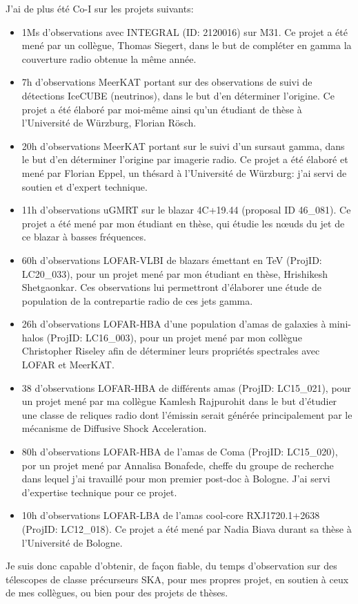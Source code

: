 \pg
J'ai de plus \'et\'e Co-I sur les projets suivants:
\begin{itemize}
	\item 1Ms d'observations avec INTEGRAL (ID: 2120016) sur M31. Ce projet a \'et\'e men\'e par un coll\`egue, Thomas Siegert, dans le but de compl\'eter en gamma la couverture radio obtenue la m\^eme ann\'ee.
	\item 7h d'observations MeerKAT portant sur des observations de suivi de d\'etections IceCUBE (neutrinos), dans le but d'en d\'eterminer l'origine. Ce projet a \'et\'e \'elabor\'e par moi-m\^eme ainsi qu'un \'etudiant de th\`ese \`a l'Universit\'e de W\"urzburg, Florian R\"osch.
	\item 20h d'observations MeerKAT portant sur le suivi d'un sursaut gamma, dans le but d'en d\'eterminer l'origine par imagerie radio. Ce projet a \'et\'e \'elabor\'e et men\'e par Florian Eppel, un th\'esard \`a l'Universit\'e de W\"urzburg: j'ai servi de soutien et d'expert technique.
	\item 11h d'observations uGMRT sur le blazar 4C+19.44 (proposal ID 46\_081). Ce projet a \'et\'e men\'e par mon \'etudiant en th\`ese, qui \'etudie les n{\oe}uds du jet de ce blazar \`a basses fr\'equences.
	\item 60h d'observations LOFAR-VLBI de blazars \'emettant en TeV (ProjID: LC20\_033), pour un projet men\'e par mon \'etudiant en th\`ese, Hrishikesh Shetgaonkar. Ces observations lui permettront d'\'elaborer une \'etude de population de la contrepartie radio de ces jets gamma.
	\item 26h d'observations LOFAR-HBA d'une population d'amas de galaxies \`a mini-halos (ProjID: LC16\_003), pour un projet men\'e par mon coll\`egue Christopher Riseley afin de d\'eterminer leurs propri\'et\'es spectrales avec LOFAR et MeerKAT. 
	\item 38 d'observations LOFAR-HBA de diff\'erents amas (ProjID: LC15\_021), pour un projet men\'e par ma coll\`egue Kamlesh Rajpurohit dans le but d'\'etudier une classe de reliques radio dont l'\'emissin serait g\'en\'er\'ee principalement par le m\'ecanisme de Diffusive Shock Acceleration.
	\item 80h d'observations LOFAR-HBA de l'amas de Coma (ProjID: LC15\_020), por un projet men\'e par Annalisa Bonafede, cheffe du groupe de recherche dans lequel j'ai travaill\'e pour mon premier post-doc \`a Bologne. J'ai servi d'expertise technique pour ce projet.
	\item 10h d'observations LOFAR-LBA de l'amas cool-core RXJ1720.1+2638 (ProjID: LC12\_018). Ce projet a \'et\'e men\'e par Nadia Biava durant sa th\`ese \`a l'Universit\'e de Bologne.
\end{itemize}

\pg
Je suis donc capable d'obtenir, de fa\c{c}on fiable, du temps d'observation sur des t\'elescopes de classe pr\'ecurseurs SKA, pour mes propres projet, en soutien \`a ceux de mes coll\`egues, ou bien pour des projets de th\`eses.






